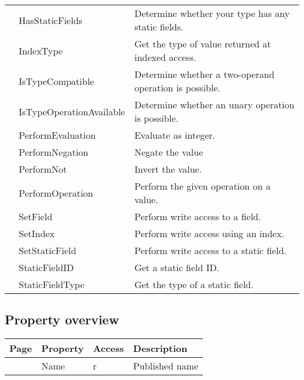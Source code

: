 \begin{tabularx}{\textwidth}{llX}
\pageref{thoriumcorepkg:thorium:tthoriumhostobjecttype:hasstaticfields} & HasStaticFields  & Determine whether your type has any static fields. \\
\pageref{thoriumcorepkg:thorium:tthoriumhostobjecttype:indextype} & IndexType  & Get the type of value returned at indexed access. \\
\pageref{thoriumcorepkg:thorium:tthoriumhostobjecttype:istypecompatible} & IsTypeCompatible  & Determine whether a two-operand operation is possible. \\
\pageref{thoriumcorepkg:thorium:tthoriumhostobjecttype:istypeoperationavailable} & IsTypeOperationAvailable  & Determine whether an unary operation is possible. \\
\pageref{thoriumcorepkg:thorium:tthoriumhostobjecttype:performevaluation} & PerformEvaluation  & Evaluate as integer. \\
\pageref{thoriumcorepkg:thorium:tthoriumhostobjecttype:performnegation} & PerformNegation  & Negate the value \\
\pageref{thoriumcorepkg:thorium:tthoriumhostobjecttype:performnot} & PerformNot  & Invert the value. \\
\pageref{thoriumcorepkg:thorium:tthoriumhostobjecttype:performoperation} & PerformOperation  & Perform the given operation on a value. \\
\pageref{thoriumcorepkg:thorium:tthoriumhostobjecttype:setfield} & SetField  & Perform write access to a field. \\
\pageref{thoriumcorepkg:thorium:tthoriumhostobjecttype:setindex} & SetIndex  & Perform write access using an index. \\
\pageref{thoriumcorepkg:thorium:tthoriumhostobjecttype:setstaticfield} & SetStaticField  & Perform write access to a static field. \\
\pageref{thoriumcorepkg:thorium:tthoriumhostobjecttype:staticfieldid} & StaticFieldID  & Get a static field ID. \\
\pageref{thoriumcorepkg:thorium:tthoriumhostobjecttype:staticfieldtype} & StaticFieldType  & Get the type of a static field. \\
\hline
\end{tabularx}
\subsection{Property overview}
\label{thoriumcorepkg:thorium:tthoriumhostobjecttype:properties}
\begin{tabularx}{\textwidth}{lllX}
Page & Property & Access & Description \\ \hline
\pageref{thoriumcorepkg:thorium:tthoriumhostobjecttype:name} & Name & r & Published name \\
\hline
\end{tabularx}
